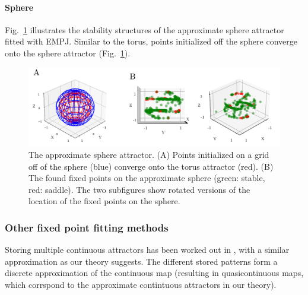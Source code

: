 \documentclass{article} %
\newcounter{ct}
\theoremstyle{definition}
\theoremstyle{remark}
\begin{document}
\paragraph{Sphere}
Fig.~\ref{fig:sphere_empj} illustrates the stability structures of  the approximate sphere  attractor fitted with EMPJ.
Similar to the torus,  points initialized off the sphere converge onto the sphere attractor (Fig.~\ref{fig:sphere_empj}).
\begin{figure}[h]
\centering
\includegraphics[width=\textwidth]{sphere_empj_ss}
\caption{The approximate sphere attractor.
(A)  Points initialized on a grid off of the sphere (blue) converge onto the torus attractor (red).
(B) The found fixed points on the approximate sphere (green: stable, red: saddle).
 The two subfigures show rotated versions of the location of the fixed points on the sphere.
}\label{fig:sphere_empj}
\end{figure}





\subsubsection{Other fixed point fitting methods}

Storing multiple continuous attractors has been worked out in \citep{battista2020capacity}, with a similar approximation as our theory suggests. The different stored patterns form a discrete approximation of the continuous map (resulting in quasicontinuous maps, which corrspond to the approximate contintuous attractors in our theory).






%
%
%
%
\end{document}
